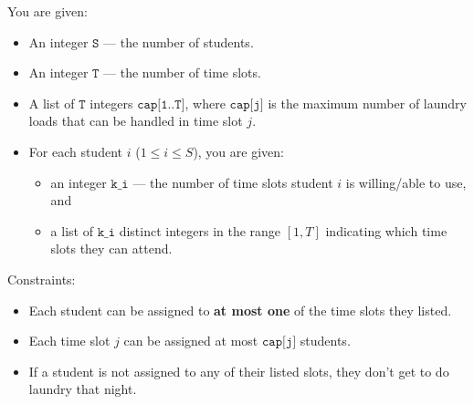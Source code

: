 You are given:
\begin{itemize}
    \item An integer \(\texttt{S}\) --- the number of students.
    \item An integer \(\texttt{T}\) --- the number of time slots.
    \item A list of \(\texttt{T}\) integers \(\texttt{cap[1..T]}\), where
    \(\texttt{cap[j]}\) is the maximum number of laundry loads that can be
    handled in time slot \(j\).
    \item For each student \(i\) (\(1 \le i \le S\)), you are given:
    \begin{itemize}
        \item an integer \(\texttt{k\_i}\) --- the number of time slots student
        \(i\) is willing/able to use, and
        \item a list of \(\texttt{k\_i}\) distinct integers in the range \([1,
        T]\) indicating which time slots they can attend.
    \end{itemize}
\end{itemize}

\noindent
Constraints:
\begin{itemize}
    \item Each student can be assigned to \textbf{at most one} of the time slots
    they listed.
    \item Each time slot \(j\) can be assigned at most \(\texttt{cap[j]}\)
    students.
    \item If a student is not assigned to any of their listed slots, they don't
    get to do laundry that night.
\end{itemize}
